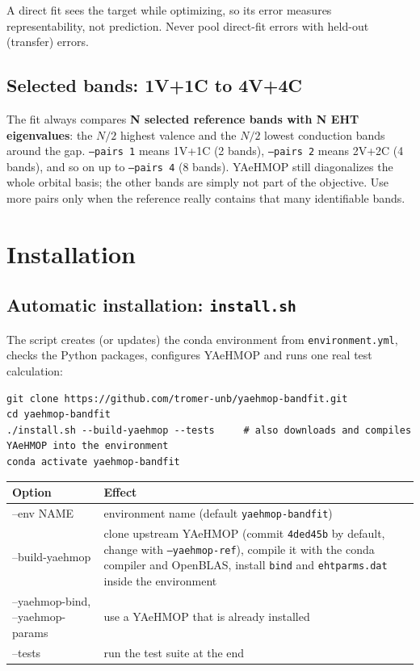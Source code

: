 \documentclass[11pt,a4paper]{article}
\newcommand{\cmd}[1]{\texttt{#1}}
\renewcommand{\_}{\origunderscore\allowbreak}
\begin{document}
\begin{aviso}
A direct fit sees the target while optimizing, so its error measures representability, not prediction.
Never pool direct-fit errors with held-out (transfer) errors.
\end{aviso}

\subsection{Selected bands: 1V+1C to 4V+4C}

The fit always compares \textbf{N selected reference bands with N EHT eigenvalues}: the $N/2$ highest
valence and the $N/2$ lowest conduction bands around the gap. \cmd{--pairs 1} means 1V+1C (2 bands),
\cmd{--pairs 2} means 2V+2C (4 bands), and so on up to \cmd{--pairs 4} (8 bands). YAeHMOP still
diagonalizes the whole orbital basis; the other bands are simply not part of the objective. Use more
pairs only when the reference really contains that many identifiable bands.

\section{Installation}

\subsection{Automatic installation: \cmd{install.sh}}

The script creates (or updates) the conda environment from \cmd{environment.yml}, checks the Python
packages, configures YAeHMOP and runs one real test calculation:

\begin{lstlisting}[style=sh]
git clone https://github.com/tromer-unb/yaehmop-bandfit.git
cd yaehmop-bandfit
./install.sh --build-yaehmop --tests     # also downloads and compiles YAeHMOP into the environment
conda activate yaehmop-bandfit
\end{lstlisting}

\begin{center}
\begin{tabularx}{\textwidth}{>{\ttfamily}l L}
\toprule
\normalfont Option & Effect \\
\midrule
--env NAME & environment name (default \cmd{yaehmop-bandfit}) \\
--build-yaehmop & clone upstream YAeHMOP (commit \cmd{4ded45b} by default, change with \cmd{--yaehmop-ref}), compile it with the conda compiler and OpenBLAS, install \cmd{bind} and \cmd{eht\_parms.dat} inside the environment \\
--yaehmop-bind, --yaehmop-params & use a YAeHMOP that is already installed \\
--tests & run the test suite at the end \\
\bottomrule
\end{tabularx}
\end{center}
\end{document}
